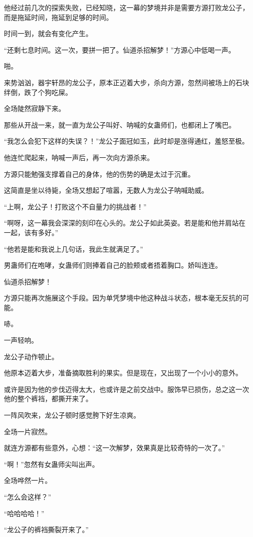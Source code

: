 \begin{this_body}
他经过前几次的探索失败，已经知晓，这一幕的梦境并非是需要方源打败龙公子，而是拖延时间，拖延到足够的时间。

时间一到，就会有变化产生。

“还剩七息时间。这一次，要拼一把了。仙道杀招解梦！”方源心中低喝一声。

啪。

来势汹汹，器宇轩昂的龙公子，原本正迈着大步，杀向方源，忽然间被场上的石块绊倒，跌了个狗吃屎。

全场陡然寂静下来。

那些从开战一来，就一直为龙公子叫好、呐喊的女蛊师们，也都闭上了嘴巴。

“我怎么会犯下这样的失误？！”龙公子面冠如玉，此时却是涨得通红，羞怒至极。

他连忙爬起来，呐喊一声后，再一次向方源杀来。

方源只能勉强支撑着自己的身体，他的伤势的确是太过于沉重。

这简直是坐以待毙，全场又想起了喧嚣，无数人为龙公子呐喊助威。

“上啊，龙公子！打败这个不自量力的挑战者！”

“啊呀，这一幕我会深深的刻印在心头的。龙公子如此英姿。若是能和他并肩站在一起，该有多好。”

“他若是能和我说上几句话，我此生就满足了。”

男蛊师们在咆哮，女蛊师们则捧着自己的脸颊或者捂着胸口。娇叫连连。

仙道杀招解梦！

方源只能再次施展这个手段。因为单凭梦境中他这种战斗状态，根本毫无反抗的可能。

哧。

一声轻响。

龙公子动作顿止。

他原本迈着大步，准备摘取胜利的果实。但是现在，又出现了一个小小的意外。

或许是因为他的步伐迈得太大，也或许是之前交战中。服饰早已损伤，总之这一次他的整个裤裆，都撕开来了。

一阵风吹来，龙公子顿时感觉胯下好生凉爽。

全场一片寂然。

就连方源都有些意外，心想：“这一次解梦，效果真是比较奇特的一次了。”

“啊！”忽然有女蛊师尖叫出声。

全场哗然一片。

“怎么会这样？”

“哈哈哈哈！”

“龙公子的裤裆撕裂开来了。”


\end{this_body}
